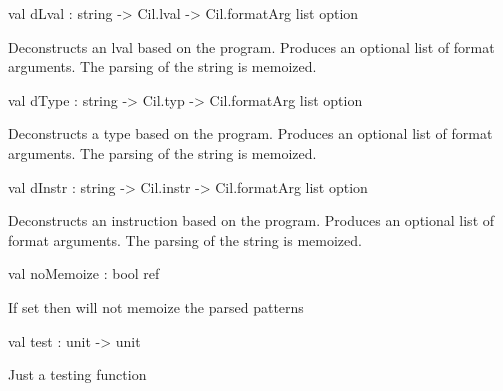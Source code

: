 \documentclass[11pt]{article}
\begin{document}
\label{val:Formatcil.dLval}\begin{ocamldoccode}
val dLval : string -> Cil.lval -> Cil.formatArg list option
\end{ocamldoccode}
\begin{ocamldocdescription}
Deconstructs an lval based on the program. Produces an optional 
 list of format arguments. The parsing of the string is memoized.


\end{ocamldocdescription}




\label{val:Formatcil.dType}\begin{ocamldoccode}
val dType : string -> Cil.typ -> Cil.formatArg list option
\end{ocamldoccode}
\begin{ocamldocdescription}
Deconstructs a type based on the program. Produces an optional list of 
 format arguments. The parsing of the string is memoized.


\end{ocamldocdescription}




\label{val:Formatcil.dInstr}\begin{ocamldoccode}
val dInstr : string -> Cil.instr -> Cil.formatArg list option
\end{ocamldoccode}
\begin{ocamldocdescription}
Deconstructs an instruction based on the program. Produces an optional 
 list of format arguments. The parsing of the string is memoized.


\end{ocamldocdescription}




\label{val:Formatcil.noMemoize}\begin{ocamldoccode}
val noMemoize : bool ref
\end{ocamldoccode}
\begin{ocamldocdescription}
If set then will not memoize the parsed patterns


\end{ocamldocdescription}




\label{val:Formatcil.test}\begin{ocamldoccode}
val test : unit -> unit
\end{ocamldoccode}
\begin{ocamldocdescription}
Just a testing function


\end{ocamldocdescription}
\end{document}
